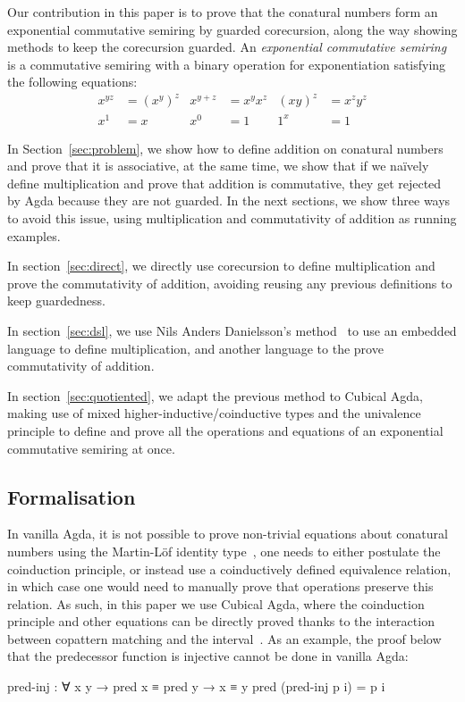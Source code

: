 Our contribution in this paper is to prove that the conatural numbers form an
exponential commutative semiring by guarded corecursion, along the way showing
methods to keep the corecursion guarded. An \emph{exponential commutative
semiring} is a commutative semiring with a binary operation for exponentiation
satisfying the following equations:
\begin{align*}
  x^{yz} &= (x^y)^z & x^{y+z} &= x^y x^z & (xy)^z &= x^z y^z \\
  x^1 &= x & x^0 &= 1 & 1^x &= 1
\end{align*}

In Section~\ref{sec:problem}, we show how to define addition on conatural
numbers and prove that it is associative, at the same time, we show that if we
naïvely define multiplication and prove that addition is commutative, they get
rejected by Agda because they are not guarded. In the next sections, we show
three ways to avoid this issue, using multiplication and commutativity of
addition as running examples.

In section~\ref{sec:direct}, we directly use corecursion to define
multiplication and prove the commutativity of addition, avoiding reusing any
previous definitions to keep guardedness.

In section~\ref{sec:dsl}, we use Nils Anders Danielsson's
method~\cite{danielsson-beating} to use an embedded language to define
multiplication, and another language to the prove commutativity of addition.

In section~\ref{sec:quotiented}, we adapt the previous method to Cubical Agda,
making use of mixed higher-inductive/coinductive types and the univalence
principle to define and prove all the operations and equations of an exponential
commutative semiring at once.

\subsection{Formalisation}

In vanilla Agda, it is not possible to prove non-trivial equations about
conatural numbers using the Martin-Löf identity type~\cite{mcbride-unfold}, one
needs to either postulate the coinduction principle, or instead use a
coinductively defined equivalence relation, in which case one would need to
manually prove that operations preserve this relation. As such, in this paper we
use Cubical Agda, where the coinduction principle and other equations can be
directly proved thanks to the interaction between copattern matching and the
interval~\cite{vezzosi-cubical}. As an example, the proof below that the
predecessor function is injective cannot be done in vanilla Agda:
\begin{code}
pred-inj : ∀ {x y} → pred x ≡ pred y → x ≡ y
pred (pred-inj p i) = p i
\end{code}

